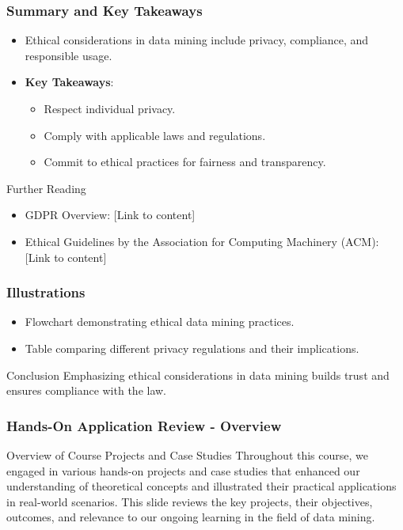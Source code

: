 \documentclass{beamer}
\begin{document}
\begin{frame}[fragile]
    \frametitle{Summary and Key Takeaways}
    \begin{itemize}
        \item Ethical considerations in data mining include privacy, compliance, and responsible usage.
        \item \textbf{Key Takeaways}:
        \begin{itemize}
            \item Respect individual privacy.
            \item Comply with applicable laws and regulations.
            \item Commit to ethical practices for fairness and transparency.
        \end{itemize}
    \end{itemize}
    \begin{block}{Further Reading}
        \begin{itemize}
            \item GDPR Overview: [Link to content]
            \item Ethical Guidelines by the Association for Computing Machinery (ACM): [Link to content]
        \end{itemize}
    \end{block}
\end{frame}

\begin{frame}[fragile]
    \frametitle{Illustrations}
    \begin{itemize}
        \item Flowchart demonstrating ethical data mining practices.
        \item Table comparing different privacy regulations and their implications.
    \end{itemize}
    \begin{block}{Conclusion}
        Emphasizing ethical considerations in data mining builds trust and ensures compliance with the law.
    \end{block}
\end{frame}

\begin{frame}[fragile]
    \frametitle{Hands-On Application Review - Overview}
    \begin{block}{Overview of Course Projects and Case Studies}
        Throughout this course, we engaged in various hands-on projects and case studies that enhanced our understanding of theoretical concepts and illustrated their practical applications in real-world scenarios. 
        This slide reviews the key projects, their objectives, outcomes, and relevance to our ongoing learning in the field of data mining.
    \end{block}
\end{frame}
\end{document}
